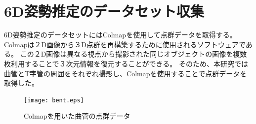 \section{6D姿勢推定のデータセット収集}
6D姿勢推定のデータセットにはColmapを使用して点群データを取得する。Colmapは２D画像から３D点群を再構築するために使用されるソフトウェアである。
この２D画像は異なる視点から撮影された同じオブジェクトの画像を複数枚利用することで３次元情報を復元することができる。
そのため、本研究では曲管とT字管の周囲をそれぞれ撮影し、Colmapを使用することで点群データを取得した。

\begin{figure}[htbt]
	\centering
	 \texttt{[image: bent.eps]}
	 \caption{Colmapを用いた曲菅の点群データ}
	 \label{fig:f2}
\end{figure}